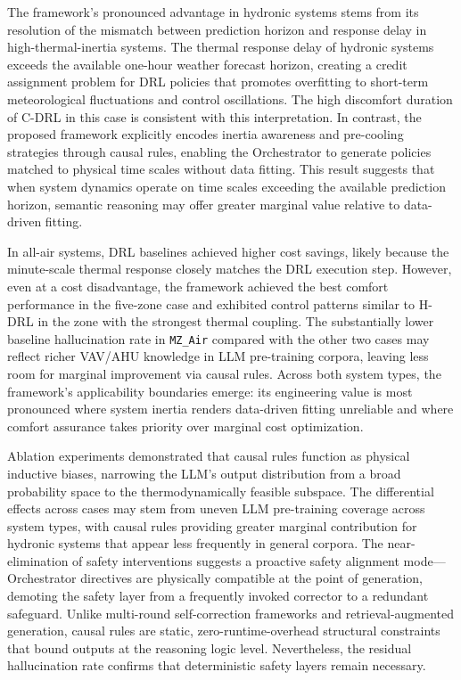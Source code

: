 \documentclass[a4paper]{cas-sc}
\begin{document}
The framework's pronounced advantage in hydronic systems stems from its resolution of the mismatch between prediction horizon and response delay in high-thermal-inertia systems. The thermal response delay of hydronic systems exceeds the available one-hour weather forecast horizon, creating a credit assignment problem for DRL policies that promotes overfitting to short-term meteorological fluctuations and control oscillations. The high discomfort duration of C-DRL in this case is consistent with this interpretation. In contrast, the proposed framework explicitly encodes inertia awareness and pre-cooling strategies through causal rules, enabling the Orchestrator to generate policies matched to physical time scales without data fitting. This result suggests that when system dynamics operate on time scales exceeding the available prediction horizon, semantic reasoning may offer greater marginal value relative to data-driven fitting.

In all-air systems, DRL baselines achieved higher cost savings, likely because the minute-scale thermal response closely matches the DRL execution step. However, even at a cost disadvantage, the framework achieved the best comfort performance in the five-zone case and exhibited control patterns similar to H-DRL in the zone with the strongest thermal coupling. The substantially lower baseline hallucination rate in \texttt{MZ\_Air} compared with the other two cases may reflect richer VAV/AHU knowledge in LLM pre-training corpora, leaving less room for marginal improvement via causal rules. Across both system types, the framework's applicability boundaries emerge: its engineering value is most pronounced where system inertia renders data-driven fitting unreliable and where comfort assurance takes priority over marginal cost optimization.

Ablation experiments demonstrated that causal rules function as physical inductive biases, narrowing the LLM's output distribution from a broad probability space to the thermodynamically feasible subspace. The differential effects across cases may stem from uneven LLM pre-training coverage across system types, with causal rules providing greater marginal contribution for hydronic systems that appear less frequently in general corpora. The near-elimination of safety interventions suggests a proactive safety alignment mode---Orchestrator directives are physically compatible at the point of generation, demoting the safety layer from a frequently invoked corrector to a redundant safeguard. Unlike multi-round self-correction frameworks and retrieval-augmented generation, causal rules are static, zero-runtime-overhead structural constraints that bound outputs at the reasoning logic level. Nevertheless, the residual hallucination rate confirms that deterministic safety layers remain necessary.
\end{document}
